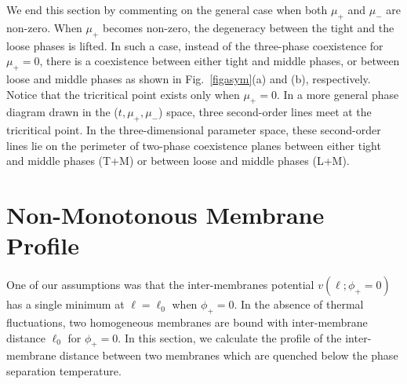 We end this section by commenting on the general case when both
$\mu_+$ and $\mu_-$ are non-zero. When $\mu_+$ becomes non-zero,
the degeneracy between the tight and the loose phases is lifted.
In such a case, instead of the three-phase coexistence for
$\mu_+=0$, there is a coexistence between either tight and middle
phases, or between loose and middle phases as shown in Fig.\
\ref{figasym}(a) and (b), respectively. Notice that the
tricritical point exists only when $\mu_+=0$. In a more general
phase diagram drawn in the ($t,\mu_+,\mu_-$) space, three
second-order lines meet at the tricritical point. In the
three-dimensional parameter space, these second-order lines lie on
the perimeter of two-phase coexistence planes between either tight
and middle phases (T+M) or between loose and middle phases (L+M).




\section{Non-Monotonous Membrane Profile}
\label{sec:profile}


One of our assumptions was
that the inter-membranes potential $v(\ell; \phi_+=0)$
has a single minimum at $\ell = \ell_0$ when $\phi_+=0$.
In the absence of thermal fluctuations, two homogeneous membranes are
bound with inter-membrane distance $\ell_0$ for $\phi_+=0$.
In this section, we calculate the profile of the inter-membrane distance
between two membranes which are quenched below the phase separation
temperature.


